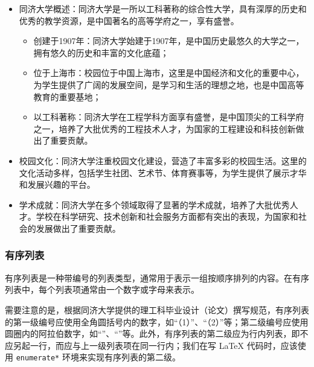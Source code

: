 \begin{itemize}
    \item 同济大学概述：同济大学是一所以工科著称的综合性大学，具有深厚的历史和优秀的教学资源，是中国著名的高等学府之一，享有盛誉。
          \begin{itemize}
              \item 创建于1907年：同济大学始建于1907年，是中国历史最悠久的大学之一，拥有悠久的历史和丰富的文化底蕴；
              \item 位于上海市：校园位于中国上海市，这里是中国经济和文化的重要中心，为学生提供了广阔的发展空间，是学习和生活的理想之地，也是中国高等教育的重要基地；
              \item 以工科著称：同济大学在工程学科方面享有盛誉，是中国顶尖的工科学府之一，培养了大批优秀的工程技术人才，为国家的工程建设和科技创新做出了重要贡献。
          \end{itemize}
    \item 校园文化：同济大学注重校园文化建设，营造了丰富多彩的校园生活。这里的文化活动多样，包括学生社团、艺术节、体育赛事等，为学生提供了展示才华和发展兴趣的平台。
    \item 学术成就：同济大学在多个领域取得了显著的学术成就，培养了大批优秀人才。学校在科学研究、技术创新和社会服务方面都有突出的表现，为国家和社会的发展做出了重要贡献。
\end{itemize}

\subsubsection{有序列表}

有序列表是一种带编号的列表类型，通常用于表示一组按顺序排列的内容。在有序列表中，每个列表项通常由一个数字或字母来表示。

需要注意的是，根据同济大学提供的理工科毕业设计（论文）撰写规范，有序列表的第一级编号应使用全角圆括号内的数字，如“（1）”、“（2）”等；第二级编号应使用圆圈内的阿拉伯数字，如“”、“”等。此外，有序列表的第二级应为行内列表，即不应另起一行，而应与上一级列表项在同一行内；我们在写 \LaTeX{} 代码时，应该使用 \texttt{enumerate*} 环境来实现有序列表的第二级。

